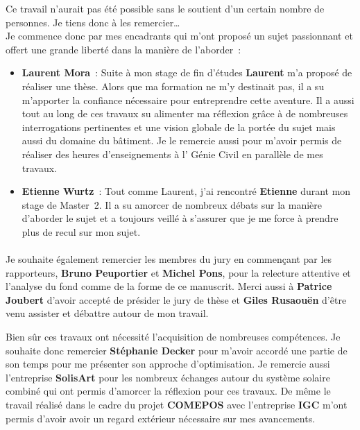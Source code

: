 
Ce travail n’aurait pas été possible sans le soutient d’un certain nombre de personnes.
Je tiens donc à les remercier\dots\\

Je commence donc par mes encadrants qui m’ont proposé un sujet passionnant et
offert une grande liberté dans la manière de l’aborder~:
\begin{itemize}
  \item \textbf{Laurent Mora}~: Suite à mon stage de fin d’études \textbf{Laurent} m’a proposé
        de réaliser une thèse. Alors que ma formation ne m’y destinait pas,
        il a su m’apporter la confiance nécessaire pour entreprendre
        cette aventure.
        Il a aussi tout au long de ces travaux su alimenter ma réflexion grâce à de
        nombreuses interrogations pertinentes et une vision globale de la portée
        du sujet mais aussi du domaine du bâtiment.
        Je le remercie aussi pour m’avoir permis de réaliser des heures d’enseignements
        à l’ Génie Civil en parallèle de mes travaux.

  \item \textbf{Etienne Wurtz}~: Tout comme Laurent, j’ai rencontré \textbf{Etienne} durant mon stage
        de Master~2. Il a su amorcer de nombreux débats sur la manière d’aborder
        le sujet et a toujours veillé à s’assurer que je me force à prendre plus de
        recul sur mon sujet.
\end{itemize}

\paragraph{} %
Je souhaite également remercier les membres du jury en commençant par les rapporteurs,
\textbf{Bruno Peuportier} et \textbf{Michel Pons}, pour la relecture attentive et l’analyse du fond comme
de la forme de ce manuscrit. Merci aussi à \textbf{Patrice Joubert} d’avoir accepté de présider
le jury de thèse et \textbf{Giles Rusaouën} d’être venu assister et débattre autour de mon travail.

Bien sûr ces travaux ont nécessité l’acquisition de nombreuses compétences. Je souhaite donc
remercier \textbf{Stéphanie Decker} pour m’avoir accordé une partie de son temps pour me présenter son
approche d’optimisation.
Je remercie aussi l’entreprise \textbf{SolisArt} pour les nombreux échanges
autour du système solaire combiné qui ont permis d’amorcer la réflexion pour ces travaux.
De même le travail réalisé dans le cadre du projet \textbf{COMEPOS} avec l’entreprise \textbf{IGC} m’ont
permis d’avoir avoir un regard extérieur nécessaire sur mes avancements.

